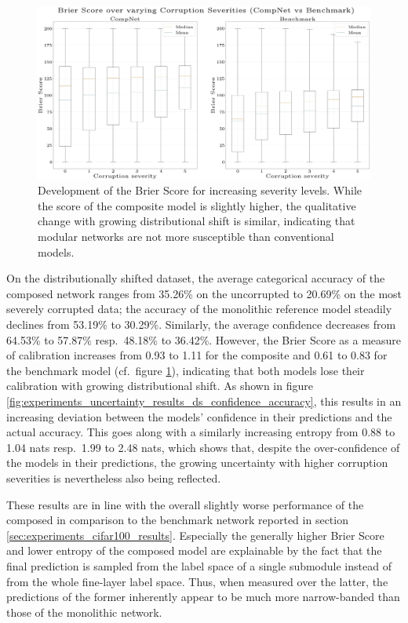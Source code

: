 \begin{figure}[tb]
    \centering
	    \includegraphics[width=\textwidth, trim=0 -25 0 -25, clip]{thesis/graphics/diagrams/uncertainty/uncertainty_compnet_benchmark_ds_brier_score_print.jpg}
    \caption{Development of the Brier Score for increasing severity levels. While the score of the composite model is slightly higher, the qualitative change with growing distributional shift is similar, indicating that modular networks are not more susceptible than conventional models.}
    \label{fig:experiments_uncertainty_results_ds_brier_score}
\end{figure}

On the distributionally shifted dataset, the average categorical accuracy of the composed network ranges from 35.26\% on the uncorrupted to 20.69\% on the most severely corrupted data; the accuracy of the monolithic reference model steadily declines from 53.19\% to 30.29\%. Similarly, the average confidence decreases from 64.53\% to 57.87\% resp.\ 48.18\% to 36.42\%. However, the Brier Score as a measure of calibration increases from 0.93 to 1.11 for the composite and 0.61 to 0.83 for the benchmark model (cf.\ figure \ref{fig:experiments_uncertainty_results_ds_brier_score}), indicating that both models lose their calibration with growing distributional shift. As shown in figure \ref{fig:experiments_uncertainty_results_ds_confidence_accuracy}, this results in an increasing deviation between the models' confidence in their predictions and the actual accuracy. This goes along with a similarly increasing entropy from 0.88 to 1.04 nats resp.\ 1.99 to 2.48 nats, which shows that, despite the over-confidence of the models in their predictions, the growing uncertainty with higher corruption severities is nevertheless also being reflected.

These results are in line with the overall slightly worse performance of the composed in comparison to the benchmark network reported in section \ref{sec:experiments_cifar100_results}. Especially the generally higher Brier Score and lower entropy of the composed model are explainable by the fact that the final prediction is sampled from the label space of a single submodule instead of from the whole fine-layer label space. Thus, when measured over the latter, the predictions of the former inherently appear to be much more narrow-banded than those of the monolithic network.

